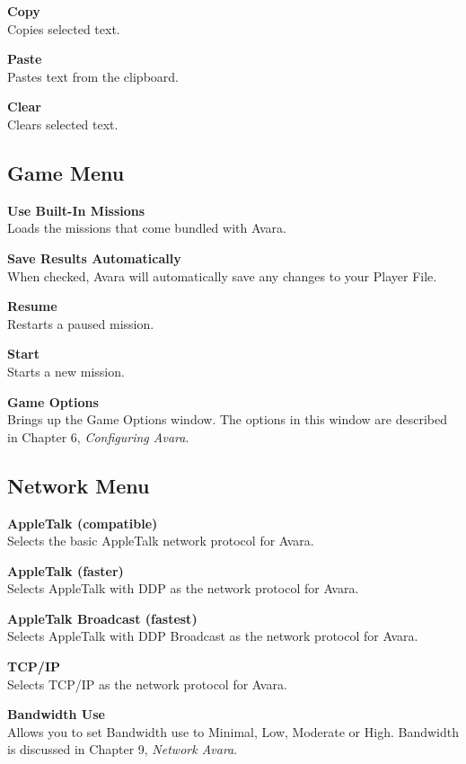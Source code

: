 \documentclass{article}
\begin{document}
\textbf{Copy\hspace{1em}}\\
Copies selected text.

\textbf{Paste\hspace{1em}}\\
Pastes text from the clipboard.

\textbf{Clear}\\
Clears selected text.

\subsection{Game Menu}
\color{black}
\textbf{Use Built-In Missions}\\
Loads the missions that come bundled with Avara.

\textbf{Save Results Automatically}\\
When checked, Avara will automatically save any changes to your Player File.

\textbf{Resume\hspace{1em}}\\
Restarts a paused mission.

\textbf{Start\hspace{1em}}\\
Starts a new mission.

\textbf{Game Options\hspace{1em}}\\
Brings up the Game Options window. The options in this window are described in Chapter 6, \textit{Configuring Avara}.

\subsection{Network Menu}
\textbf{AppleTalk (compatible)}\\
Selects the basic AppleTalk network protocol for Avara.

\textbf{AppleTalk (faster)}\\
Selects AppleTalk with DDP as the network protocol for Avara.

\textbf{AppleTalk Broadcast (fastest)}\\
Selects AppleTalk with DDP Broadcast as the network protocol for Avara.

\textbf{TCP/IP}\\
Selects TCP/IP as the network protocol for Avara.

\textbf{Bandwidth Use}\\
Allows you to set Bandwidth use to Minimal, Low, Moderate or High. Bandwidth is discussed in Chapter 9, \textit{Network Avara}.
\end{document}
